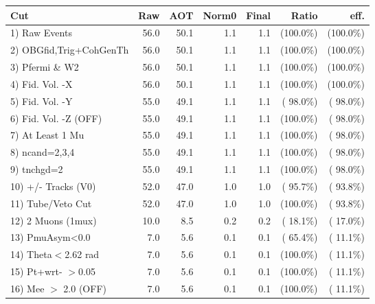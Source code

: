  \begin{table}[h!]\centering
 \begin{tabular}{||l||r|r|r|r|r|r||}
 \hline
 \hline
 Cut & Raw & AOT & Norm0 & Final & Ratio & eff.       \\
 \hline
  1) Raw Events           &         56.0 &         50.1 &          1.1 &          1.1 & (100.0\%) & (100.0\%) \\
  2) OBGfid,Trig+CohGenTh &         56.0 &         50.1 &          1.1 &          1.1 & (100.0\%) & (100.0\%) \\
  3) Pfermi \& W2         &         56.0 &         50.1 &          1.1 &          1.1 & (100.0\%) & (100.0\%) \\
  4) Fid. Vol. -X         &         56.0 &         50.1 &          1.1 &          1.1 & (100.0\%) & (100.0\%) \\
  5) Fid. Vol. -Y         &         55.0 &         49.1 &          1.1 &          1.1 & ( 98.0\%) & ( 98.0\%) \\
  6) Fid. Vol. -Z (OFF)   &         55.0 &         49.1 &          1.1 &          1.1 & (100.0\%) & ( 98.0\%) \\
  7) At Least 1 Mu        &         55.0 &         49.1 &          1.1 &          1.1 & (100.0\%) & ( 98.0\%) \\
  8) ncand=2,3,4          &         55.0 &         49.1 &          1.1 &          1.1 & (100.0\%) & ( 98.0\%) \\
  9) tnchgd=2             &         55.0 &         49.1 &          1.1 &          1.1 & (100.0\%) & ( 98.0\%) \\
 10) +/- Tracks (V0)      &         52.0 &         47.0 &          1.0 &          1.0 & ( 95.7\%) & ( 93.8\%) \\
 11) Tube/Veto Cut        &         52.0 &         47.0 &          1.0 &          1.0 & (100.0\%) & ( 93.8\%) \\
 12) 2 Muons (1mux)       &         10.0 &          8.5 &          0.2 &          0.2 & ( 18.1\%) & ( 17.0\%) \\
 13) PmuAsym<0.0          &          7.0 &          5.6 &          0.1 &          0.1 & ( 65.4\%) & ( 11.1\%) \\
 14) Theta$<$2.62 rad     &          7.0 &          5.6 &          0.1 &          0.1 & (100.0\%) & ( 11.1\%) \\
 15) Pt+wrt- $>$0.05      &          7.0 &          5.6 &          0.1 &          0.1 & (100.0\%) & ( 11.1\%) \\
 16) Mee $>$ 2.0  (OFF)   &          7.0 &          5.6 &          0.1 &          0.1 & (100.0\%) & ( 11.1\%) \\

\end{tabular}
\end{table}
